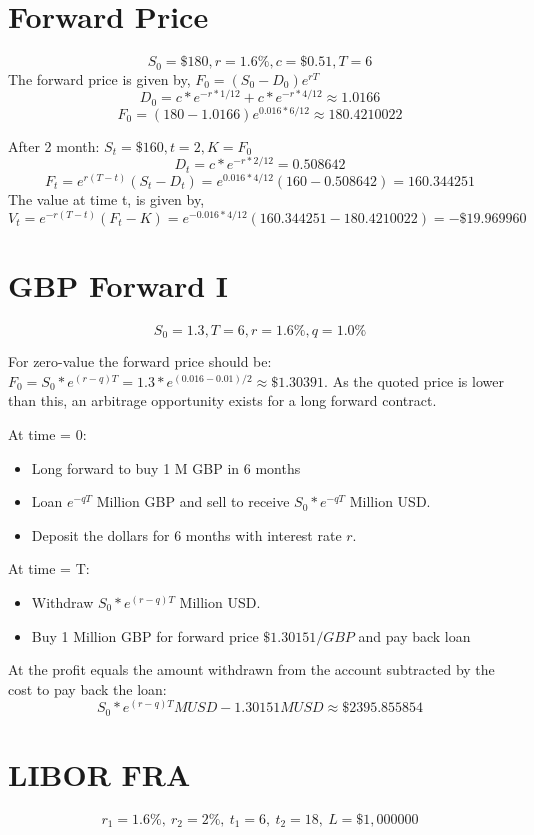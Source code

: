\documentclass{article}
\begin{document}
\thispagestyle{fancy}


\section{Forward Price}

$$S_0 = \$180, r = 1.6\%, c = \$0.51, T = 6$$
The forward price is given by, $F_0 = (S_0 - D_0)e^{rT}$
$$D_0 = c*e^{-r * 1/12} + c*e^{-r * 4/12} \approx 1.0166 $$
$$F_0 = (180 - 1.0166)e^{0.016 * 6/12} \approx 180.4210022$$

After 2 month: $S_t = \$160, t=2, K=F_0$
$$D_t = c * e^{-r * 2/12} = 0.508642$$
$$F_t = e^{r(T-t)}(S_t - D_t) = e^{0.016 * 4/12}(160-0.508642) = 160.344251$$
The value at time t, is given by,
$$V_t = e^{-r(T-t)}(F_t - K) = e^{-0.016 * 4/12}(160.344251-180.4210022) = -\$19.969960$$

\section{GBP Forward I}

$$S_0 = 1.3, T=6, r = 1.6\%, q = 1.0\%$$

For zero-value the forward price should be: $F_0 = S_0*e^{(r-q)T} = 1.3 * e^{(0.016-0.01)/2} \approx \$1.30391 $. As the quoted price is lower than this, an arbitrage opportunity exists for a long forward contract.

At time = 0: 
\begin{itemize}
	\item Long forward to buy 1 M GBP in 6 months
	\item Loan $e^{-qT}$ Million GBP and sell to receive $S_0*e^{-qT}$ Million USD.
	\item Deposit the dollars for 6 months with interest rate $r$.
\end{itemize}

At time = T: 
\begin{itemize}
	\item Withdraw $S_0 * e^{(r-q)T}$ Million USD.
	\item Buy 1 Million GBP for forward price $\$1.30151/GBP$ and pay back loan
\end{itemize}
At the profit equals the amount withdrawn from the account subtracted by the cost to pay back the loan:
$$ S_0 * e^{(r-q)T} MUSD - 1.30151 MUSD \approx \$2395.855854$$

\section{LIBOR FRA}
$$r_1 = 1.6\%, \ r_2 = 2\%, \ t_1 = 6, \ t_2 = 18, \ L = \$1,000000$$
\end{document}
